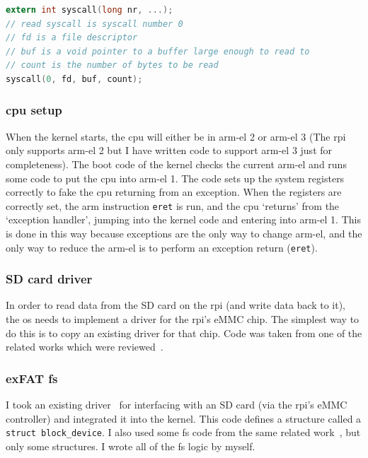 \documentclass{article}
\begin{document}
\begin{lstlisting}[language=C, caption={How some C code would invoke the system
                   call \texttt{read} in the current implementation.}, float,
                   label={lst:syscall-example-read}]
extern int syscall(long nr, ...);
// read syscall is syscall number 0
// fd is a file descriptor
// buf is a void pointer to a buffer large enough to read to
// count is the number of bytes to be read
syscall(0, fd, buf, count);
\end{lstlisting}

\subsubsection{\texorpdfstring{\gls{cpu}}{CPU} setup}
\label{sec:impl_cpu_setup}
When the kernel starts, the \gls{cpu} will either be in \gls{arm-el} 2 or
\gls{arm-el} 3 (The \gls{rpi} only supports \gls{arm-el} 2 but I have written
code to support \gls{arm-el} 3 just for completeness). The boot code of the
kernel checks the current \gls{arm-el} and runs some code to put the \gls{cpu}
into \gls{arm-el} 1. The code sets up the system registers correctly to fake
the \gls{cpu} returning from an exception. When the registers are correctly
set, the \gls{arm} instruction \texttt{eret} is run, and the \gls{cpu}
`returns' from the `exception handler', jumping into the kernel code and
entering into \gls{arm-el} 1. This is done in this way because exceptions are
the only way to change \gls{arm-el}, and the only way to reduce the
\gls{arm-el} is to perform an exception return (\texttt{eret}).

\subsubsection{SD card driver}
In order to read data from the SD card on the \gls{rpi} (and write data back to
it), the \gls{os} needs to implement a driver for the \gls{rpi}'s eMMC chip.
The simplest way to do this is to copy an existing driver for that chip. Code
was taken from one of the related works which were reviewed~\cite{rpi-boot-gh}.

\subsubsection{exFAT \texorpdfstring{\gls{fs}}{Filesystem}}
\label{sec:impl_fs}
I took an existing driver~\cite{rpi-boot-gh} for interfacing with an SD card
(via the \gls{rpi}'s eMMC controller) and integrated it into the kernel. This
code defines a structure called a \verb!struct block_device!. I also used some
\gls{fs} code from the same related work~\cite{rpi-boot-gh}, but only some
structures. I wrote all of the \gls{fs} logic by myself.
\end{document}
